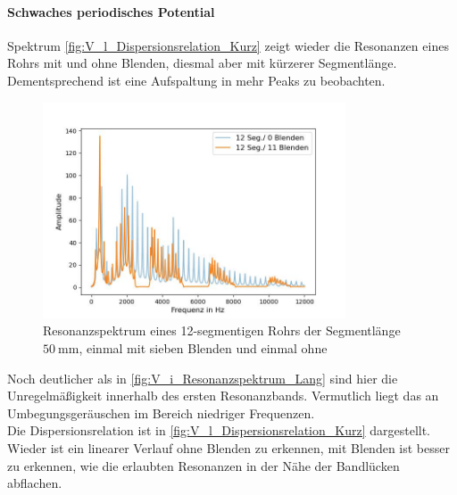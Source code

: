 \documentclass[../main.tex]{subfiles}
\begin{document}
    \paragraph{Schwaches periodisches Potential}
        Spektrum \ref{fig:V_l_Dispersionsrelation_Kurz} zeigt wieder die Resonanzen eines Rohrs mit und ohne Blenden, diesmal aber mit kürzerer Segmentlänge. Dementsprechend ist eine Aufspaltung in mehr Peaks zu beobachten.

        \begin{figure}[H]
            \centering
            \includegraphics[width=0.8\textwidth]{Bilddateien/Auswertung/V_l_Resonanzspektrum_Kurz.jpg}
            \caption{Resonanzspektrum eines 12-segmentigen Rohrs der Segmentlänge $\SI{50}{\milli\metre}$, einmal mit sieben Blenden und einmal ohne}
            \label{fig:V_l_Resonanzspektrum_Kurz}
        \end{figure}

        Noch deutlicher als in \ref{fig:V_i_Resonanzspektrum_Lang} sind hier die Unregelmäßigkeit innerhalb des ersten Resonanzbands. Vermutlich liegt das an Umbegungsgeräuschen im Bereich niedriger Frequenzen.\\

        Die Dispersionsrelation ist in \ref{fig:V_l_Dispersionsrelation_Kurz} dargestellt. Wieder ist ein linearer Verlauf ohne Blenden zu erkennen, mit Blenden ist besser zu erkennen, wie die erlaubten Resonanzen in der Nähe der Bandlücken abflachen.
\end{document}
